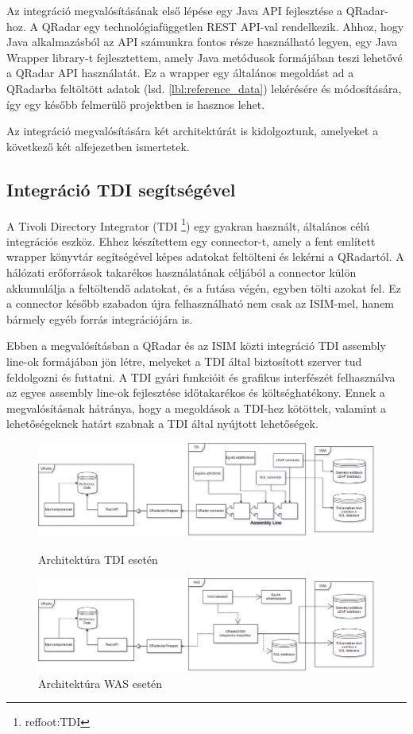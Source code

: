 Az integráció megvalósításának első lépése egy Java API fejlesztése a QRadar-hoz. A QRadar egy technológiafüggetlen REST API-val rendelkezik. Ahhoz, hogy Java alkalmazásból az API számunkra fontos része használható legyen, egy Java Wrapper library-t fejlesztettem, amely Java metódusok formájában teszi lehetővé a QRadar API használatát. Ez a wrapper egy általános megoldást ad a QRadarba feltöltött adatok (lsd. \ref{lbl:reference_data}) lekérésére és módosítására, így egy később felmerülő projektben is hasznos lehet.

Az integráció megvalósítására két architektúrát is kidolgoztunk, amelyeket a következő két alfejezetben ismertetek.

\subsection{Integráció TDI segítségével}

A Tivoli Directory Integrator (TDI \footnote[3]{ref{foot:TDI}}) egy gyakran használt, általános célú integrációs eszköz. Ehhez készítettem egy connector-t, amely a fent említett wrapper könyvtár segítségével képes adatokat feltölteni és lekérni a QRadartól. A hálózati erőforrások takarékos használatának céljából a connector külön akkumulálja a feltöltendő adatokat, és a futása végén, egyben tölti azokat fel. Ez a connector később szabadon újra felhasználható nem csak az ISIM-mel, hanem bármely egyéb forrás integrációjára is.

Ebben a megvalósításban a QRadar és az ISIM közti integráció TDI assembly line-ok formájában jön létre, melyeket a TDI által biztosított szerver tud feldolgozni és futtatni. A TDI gyári funkcióit és grafikus interfészét felhasználva az egyes assembly line-ok fejlesztése időtakarékos és költséghatékony. Ennek a megvalósításnak hátránya, hogy a megoldások a TDI-hez kötöttek, valamint a lehetőségeknek határt szabnak a TDI által nyújtott lehetőségek.


\begin{figure}[]
	\centering
	\includegraphics[width=1.0\linewidth]{figures/TDI_architecture.png}
	\caption{Architektúra TDI esetén}
	\label{fig:tdi-architecture}
	\includegraphics[width=1.0\linewidth]{figures/WAS_architecture.png}
	\caption{Architektúra WAS esetén}
	\label{fig:wasarchitecture}
\end{figure}


